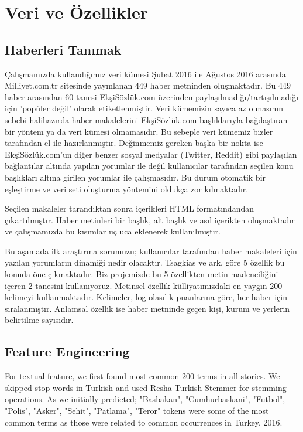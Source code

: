 \documentclass[conference]{IEEEtran}
\begin{document}
\section{Veri ve Özellikler}
\subsection{Haberleri Tanımak}
Çalışmamızda kullandığımız veri kümesi Şubat 2016 ile Ağustos 2016 arasında Milliyet.com.tr sitesinde yayınlanan 449 haber metninden oluşmaktadır. Bu 449 haber arasından 60 tanesi EkşiSözlük.com üzerinden paylaşılmadığı/tartışılmadığı için 'popüler değil' olarak etiketlenmiştir. Veri kümemizin sayıca az olmasının sebebi halihazırda haber makalelerini EkşiSözlük.com başlıklarıyla bağdaştıran bir yöntem ya da veri kümesi olmamasıdır. Bu sebeple veri kümemiz bizler tarafından el ile hazırlanmıştır. Değinmemiz gereken başka bir nokta ise EkşiSözlük.com'un diğer benzer sosyal medyalar (Twitter, Reddit) gibi paylaşılan bağlantılar altında yapılan yorumlar ile değil kullanıcılar tarafından seçilen konu başlıkları altına girilen yorumlar ile çalışmasıdır. Bu durum otomatik bir eşleştirme ve veri seti oluşturma yöntemini oldukça zor kılmaktadır.

Seçilen makaleler tarandıktan sonra içerikleri HTML formatındandan çıkartılmıştır. Haber metinleri bir başlık, alt başlık ve asıl içerikten oluşmaktadır ve çalışmamızda bu kısımlar uç uca eklenerek kullanılmıştır.

Bu aşamada ilk araştırma sorumuzu; kullanıcılar tarafından haber makaleleri için yazılan yorumların dinamiği nedir olacaktır. Tsagkias ve ark. \cite{tsagkias_predicting_2009} göre 5 özellik bu konuda öne çıkmaktadır. Biz projemizde bu 5 özellikten metin madenciliğini içeren 2 tanesini kullanıyoruz. Metinsel özellik külliyatımızdaki en yaygın 200 kelimeyi kullanmaktadır. Kelimeler, log-olasılık puanlarına göre, her haber için sıralanmıştır. Anlamsal özellik ise haber metninde geçen kişi, kurum ve yerlerin belirtilme sayısıdır.

\subsection{Feature Engineering}
For textual feature, we first found most common 200 terms in all stories. We skipped stop words in Turkish and used Resha Turkish Stemmer \cite{resha-turkish-stemmer} for stemming operations. As we initially predicted; "Basbakan", "Cumhurbaskani", "Futbol", "Polis", "Asker", "Sehit", "Patlama", "Teror" tokens were some of the most common terms as those were related to common occurrences in Turkey, 2016.
\end{document}
